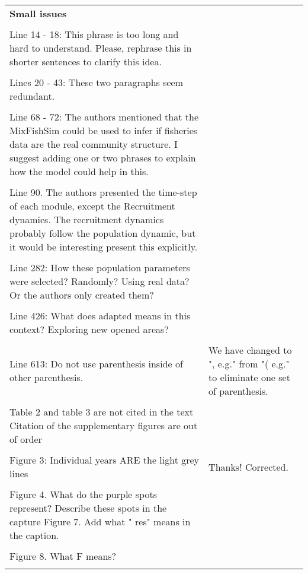 \documentclass{article}
\begin{document}
\begin{landscape}
\begin{center}
\begin{longtable}{p{12cm} | p{12cm}}
	\textbf{Small issues} &  \\
\\
Line 14 - 18: This phrase is too long and hard to understand. Please, rephrase
this in shorter sentences to clarify this idea. & \\
\\
Lines 20 - 43: These two paragraphs seem redundant.  & \\
\\
Line 68 - 72: The authors mentioned that the MixFishSim could be used to infer
if fisheries data are the real community structure. I suggest adding one or two
phrases to explain how the model could help in this. & \\
\\
Line 90. The authors presented the time-step of each module, except the
Recruitment dynamics. The recruitment dynamics probably follow the population
dynamic, but it would be interesting present this explicitly. & \\
\\
Line 282: How these population parameters were selected? Randomly? Using real
data? Or the authors only created them? & \\
\\
Line 426: What does adapted means in this context? Exploring new opened areas?
& \\
\\
Line 613: Do not use parenthesis inside of other parenthesis. & We have changed
to ", e.g." from "( e.g." to eliminate one set of parenthesis. \\
\\
Table 2 and table 3 are not cited in the text Citation of the supplementary
figures are out of order & \\
\\
Figure 3: Individual years ARE the light grey lines    & Thanks! Corrected. \\
\\
Figure 4. What do the purple spots represent? Describe these spots in the
capture Figure 7. Add what " res"  means in the caption.  & \\
\\
Figure 8. What F means? & \\
\\
		\bottomrule
	\end{longtable}

\end{center}

\end{landscape}
\end{document}
